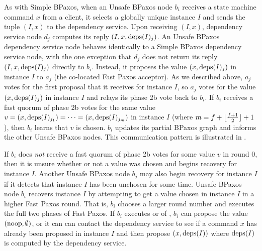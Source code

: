 As with Simple BPaxos, when an Unsafe BPaxos node $b_i$ receives a state
machine command $x$ from a client, it selects a globally unique instance $I$
and sends the tuple $(I, x)$ to the dependency service. Upon receiving $(I,
x)$, dependency service node $d_j$ computes its reply $(I, x, \text{deps}(I)_j)$.  An
Unsafe BPaxos dependency service node behaves identically to a Simple BPaxos
dependency service node, with the one exception that $d_j$ does not return its
reply $(I, x, \text{deps}(I)_j)$ directly to $b_i$. Instead, it proposes the value
$(x, \text{deps}(I)_j)$ in instance $I$ to $a_j$ (the co-located Fast Paxos
acceptor). As we described above, $a_j$ votes for the first proposal that it
receives for instance $I$, so $a_j$ votes for the value $(x, \text{deps}(I)_j)$ in
instance $I$ and relays its phase 2b vote back to $b_i$.
%
If $b_i$ receives a fast quorum of phase 2b votes for the same value $v = (x,
\text{deps}(I)_{j_1}) = \cdots = (x, \text{deps}(I)_{j_m})$ in instance $I$ (where $m =
f + \lfloor\frac{f + 1}{2}\rfloor + 1$), then $b_i$ learns that $v$ is chosen. $b_i$ updates its
partial BPaxos graph and informs the other Unsafe BPaxos nodes. This
communication pattern is illustrated in .



If $b_i$ does \emph{not} receive a fast quorum of phase 2b votes for some value
$v$ in round 0, then it is unsure whether or not a value was chosen and begins
recovery for instance $I$. Another Unsafe BPaxos node $b_j$ may also begin
recovery for instance $I$ if it detects that instance $I$ has been unchosen for
some time.
%
Unsafe BPaxos node $b_i$ recovers instance $I$ by attempting to get a value
chosen in instance $I$ in a higher Fast Paxos round. That is, $b_i$ chooses a
larger round number and executes the full two phases of Fast Paxos. If $b_i$
executes  or  of
, $b_i$ can propose the value $(\text{noop}, \emptyset)$, or it
can can contact the dependency service to see if a command $x$ has already been
proposed in instance $I$ and then propose $(x, \text{deps}(I))$ where $\text{deps}(I)$ is
computed by the dependency service.

